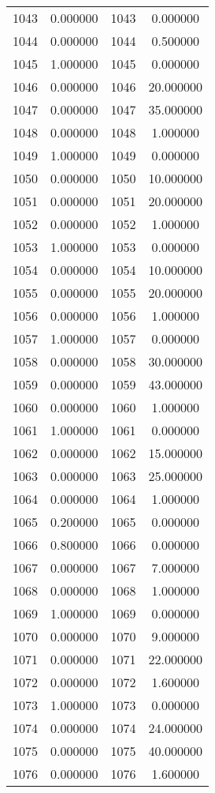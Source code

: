 \documentclass[12pt]{article}
\begin{document}
\begin{longtable}{@{}cccc@{}}
1043 & 0.000000 & 1043 & 0.000000 \\
1044 & 0.000000 & 1044 & 0.500000 \\
1045 & 1.000000 & 1045 & 0.000000 \\
1046 & 0.000000 & 1046 & 20.000000 \\
1047 & 0.000000 & 1047 & 35.000000 \\
1048 & 0.000000 & 1048 & 1.000000 \\
1049 & 1.000000 & 1049 & 0.000000 \\
1050 & 0.000000 & 1050 & 10.000000 \\
1051 & 0.000000 & 1051 & 20.000000 \\
1052 & 0.000000 & 1052 & 1.000000 \\
1053 & 1.000000 & 1053 & 0.000000 \\
1054 & 0.000000 & 1054 & 10.000000 \\
1055 & 0.000000 & 1055 & 20.000000 \\
1056 & 0.000000 & 1056 & 1.000000 \\
1057 & 1.000000 & 1057 & 0.000000 \\
1058 & 0.000000 & 1058 & 30.000000 \\
1059 & 0.000000 & 1059 & 43.000000 \\
1060 & 0.000000 & 1060 & 1.000000 \\
1061 & 1.000000 & 1061 & 0.000000 \\
1062 & 0.000000 & 1062 & 15.000000 \\
1063 & 0.000000 & 1063 & 25.000000 \\
1064 & 0.000000 & 1064 & 1.000000 \\
1065 & 0.200000 & 1065 & 0.000000 \\
1066 & 0.800000 & 1066 & 0.000000 \\
1067 & 0.000000 & 1067 & 7.000000 \\
1068 & 0.000000 & 1068 & 1.000000 \\
1069 & 1.000000 & 1069 & 0.000000 \\
1070 & 0.000000 & 1070 & 9.000000 \\
1071 & 0.000000 & 1071 & 22.000000 \\
1072 & 0.000000 & 1072 & 1.600000 \\
1073 & 1.000000 & 1073 & 0.000000 \\
1074 & 0.000000 & 1074 & 24.000000 \\
1075 & 0.000000 & 1075 & 40.000000 \\
1076 & 0.000000 & 1076 & 1.600000 \\

\end{longtable}
\end{document}
